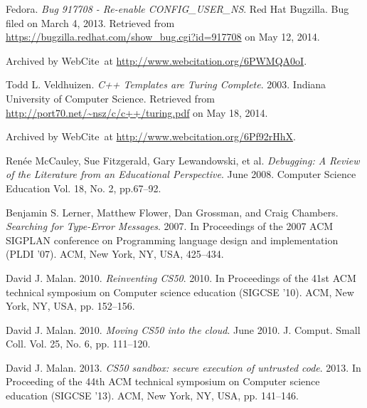 \begin{thebibliography}{9}

Fedora. \emph{Bug 917708 - Re-enable CONFIG\_USER\_NS}. Red Hat Bugzilla. Bug
filed on March 4, 2013. Retrieved from
\url{https://bugzilla.redhat.com/show_bug.cgi?id=917708} on May 12, 2014.

Archived by WebCite\textsuperscript{\textregistered}\ at
\url{http://www.webcitation.org/6PWMQA0oI}.


Todd L. Veldhuizen. \emph{C++ Templates are Turing Complete}. 2003. Indiana
University of Computer Science. Retrieved from
\url{http://port70.net/~nsz/c/c++/turing.pdf} on May 18, 2014. 

Archived by WebCite\textsuperscript{\textregistered}\ at
\url{http://www.webcitation.org/6Pf92rHhX}.


Ren\'ee McCauley, Sue Fitzgerald, Gary Lewandowski, et al. \emph{Debugging: A
Review of the Literature from an Educational Perspective}. June 2008. Computer
Science Education Vol. 18, No. 2, pp.67--92.


Benjamin S. Lerner, Matthew Flower, Dan Grossman, and  Craig Chambers.
\emph{Searching for Type-Error Messages}. 2007. In Proceedings of the 2007 ACM
SIGPLAN conference on Programming language design and implementation (PLDI
'07). ACM, New York, NY, USA, 425--434. 


David J. Malan. 2010. \emph{Reinventing CS50}. 2010. In Proceedings of the 41st
ACM technical symposium on Computer science education (SIGCSE '10). ACM, New
York, NY, USA, pp. 152--156. 


David J. Malan. 2010. \emph{Moving CS50 into the cloud}. June 2010. J. Comput.
Small Coll. Vol. 25, No. 6, pp. 111--120.


David J. Malan. 2013. \emph{CS50 sandbox: secure execution of untrusted code}.
2013.  In Proceeding of the 44th ACM technical symposium on Computer science
education (SIGCSE '13). ACM, New York, NY, USA, pp. 141--146.



\end{thebibliography}

